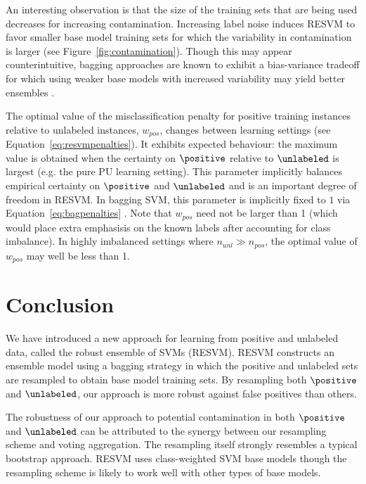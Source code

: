 An interesting observation is that the size of the training sets that are being used decreases for increasing contamination. Increasing label noise induces RESVM to favor smaller base model training sets for which the variability in contamination is larger (see Figure~\ref{fig:contamination}). Though this may appear counterintuitive, bagging approaches are known to exhibit a bias-variance tradeoff \citep{bauer1999empirical} for which using weaker base models with increased variability may yield better ensembles \citep{biasvariance}.

The optimal value of the misclassification penalty for positive training instances relative to unlabeled instances, $w_{pos}$, changes between learning settings (see Equation~\eqref{eq:resvmpenalties}). It exhibits expected behaviour: the maximum value is obtained when the certainty on $\positive$ relative to $\unlabeled$ is largest (e.g. the pure PU learning setting). This parameter implicitly balances empirical certainty on $\positive$ and $\unlabeled$ and is an important degree of freedom in RESVM. In bagging SVM, this parameter is implicitly fixed to $1$ via Equation~\eqref{eq:bagpenalties} \citep{mordelet2014bagging}. Note that $w_{pos}$ need not be larger than 1 (which would place extra emphasisis on the known labels after accounting for class imbalance). In highly imbalanced settings where $n_{unl} \gg n_{pos}$, the optimal value of $w_{pos}$ may well be less than 1.


\section{Conclusion}
We have introduced a new approach for learning from positive and unlabeled data, called the robust ensemble of SVMs (RESVM). RESVM constructs an ensemble model using a bagging strategy in which the positive and unlabeled sets are resampled to obtain base model training sets. By resampling both $\positive$ and $\unlabeled$, our approach is more robust against false positives than others.

The robustness of our approach to potential contamination in both $\positive$ and $\unlabeled$ can be attributed to the synergy between our resampling scheme and voting aggregation. The resampling itself strongly resembles a typical bootstrap approach. RESVM uses class-weighted SVM base models though the resampling scheme is likely to work well with other types of base models.

